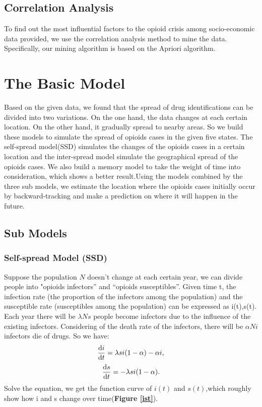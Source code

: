 \documentclass[12pt]{article}
\begin{document}
\subsection{Correlation Analysis}
To find out the most influential factors to the opioid crisis among socio-economic data provided, we use the correlation analysis method to mine the data. Specifically, our mining algorithm is based on the Apriori algorithm. 

\section{The Basic Model}
Based on the given data, we found that the spread of drug identifications can be divided into two variations. On the one hand, the data changes at each certain location. On the other hand, it gradually spread to nearby areas. So we build these models to simulate the spread of opioids cases in the given five states. The self-spread model(SSD) simulates the changes of the opioids cases in a certain location and the inter-spread model simulate the geographical spread of the opioids cases. We also build a memory model to take the weight of time into consideration, which shows a better result.Using the models combined by the three sub models, we estimate the location where the opioids cases initially occur by backward-tracking and make a prediction on where it will happen in the future.
\subsection{Sub Models}
\subsubsection{Self-spread Model (SSD)}
Suppose the population $N$ doesn't change at each certain year, we can divide people into "opioids infectors” and “opioids susceptibles”. Given time t, the infection rate (the proportion of the infectors among the population) and the susceptible rate (susceptibles among the population) can be expressed as i(t),s(t). Each year there will be $\lambda N s$ people become infectors due to the influence of the existing infectors. Considering of the death rate of the infectors, there will be $\alpha N i$ infectors die of drugs. So we have:
\begin{equation}
\frac{\mathrm{d} i}{\mathrm{d} t} = \lambda si(1-\alpha)- \alpha i \text{,}\\ 
\end{equation}
\begin{equation}
\frac{\mathrm{d} s}{\mathrm{d} t}= - \lambda si(1-\alpha) \text{.}\\ 
\end{equation}
Solve the equation, we get the function curve of $i(t)$ and $s(t)$,which roughly show how i and s change over time(\textbf{Figure \ref{ist}}).
\end{document}
